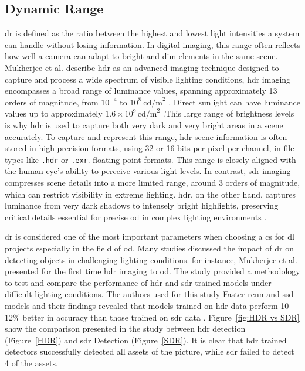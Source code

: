\subsection{Dynamic Range}
\gls{dr}  is defined as the ratio between the highest and lowest light intensities a system can handle without losing information. In digital imaging, this range often reflects how well a camera can adapt to bright and dim elements in the same scene. Mukherjee et al. describe \gls{hdr} as an advanced imaging technique designed to capture and process a wide spectrum of visible lighting conditions, \gls{hdr} imaging encompasses a broad range of luminance values, spanning approximately 13 orders of magnitude, from \( 10^{-4} \) to \( 10^8 \ \text{cd/m}^2 \) \cite{HDR}. Direct sunlight can have luminance values up to approximately \( 1.6 \times 10^9 \, \text{cd/m}^2 \) \cite{sunlight_lum}.This large range of brightness levels is why \gls{hdr} is used to capture both very dark and very bright areas in a scene accurately. To capture and represent this range, \gls{hdr} scene information is often stored in high precision formats, using 32 or 16 bits per pixel per channel, in file types like \texttt{.hdr} or \texttt{.exr}. floating point formats. This range is closely aligned with the human eye’s ability to perceive various light levels. In contrast, \gls{sdr} imaging compresses scene details into a more limited range, around 3 orders of magnitude, which can restrict visibility in extreme lighting. \gls{hdr}, on the other hand, captures luminance from very dark shadows to intensely bright highlights, preserving critical details essential for precise \gls{od} in complex lighting environments \cite{HDR}.

\gls{dr} is considered one of the most important parameters when choosing a \gls{cs} for \gls{dl} projects especially in the field of \gls{od}. Many studies discussed the impact of \gls{dr} on detecting objects in challenging lighting conditions. for instance, Mukherjee et al. presented for the first time \gls{hdr} imaging to \gls{od}. The study provided a methodology to test and compare the performance of \gls{hdr} and \gls{sdr} trained models under difficult lighting conditions. The authors used for this study Faster \gls{rcnn} and \gls{ssd} models and their findings revealed that models trained on \gls{hdr} data perform 10–12\% better in accuracy than those trained on \gls{sdr} data \cite{HDR}. Figure~\ref{fig:HDR vs SDR} show the comparison presented in the study between \gls{hdr} detection (Figure~\ref{HDR}) and \gls{sdr} Detection (Figure~\ref{SDR}). It is clear that \gls{hdr} trained detectors successfully detected all assets of the picture, while \gls{sdr} failed to detect 4 of the assets.

